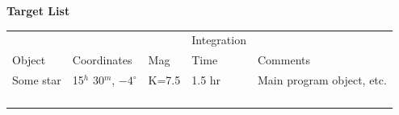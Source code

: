 \documentclass{lowell-prop}
\begin{document}
\clearpage



\begin{center}
{\bf Target List} \\[2em]
\begin{tabular}{l l l l l} 
\hline\hline 
&   &   &Integration&  \\
Object & Coordinates & Mag & Time & Comments \\ [0.5ex] 
\hline 
Some star & 15$^h$ 30$^m$, $-4^{\circ}$ & K=7.5 & 1.5 hr & Main program object, etc. \\
   &   &   &   & \\
   &   &   &   & \\
   &   &   &   & \\
   &   &   &   & \\  [1ex] 
\hline 
\end{tabular}
\end{center}
\end{document}

